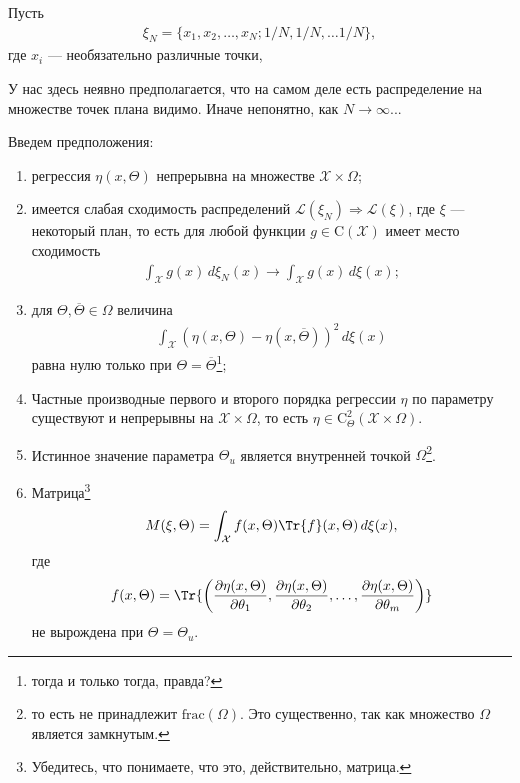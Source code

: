 Пусть 
\begin{gather*}
    \xi_N = \{x_1, x_2, \ldots, x_N; 1/N, 1/N, \ldots 1/N\},
\end{gather*}
где $x_i$ --- необязательно различные точки,

{\color{blue} У нас здесь неявно предполагается, что на самом деле есть распределение на множестве точек плана видимо. Иначе непонятно, как $N \to \infty$... }

Введем предположения:
\begin{enumerate}
    \item
    регрессия $\eta(x, \Theta)$ непрерывна на множестве $\mathcal X \times \Omega$;

    \item 
    имеется слабая сходимость распределений $\mathcal L(\xi_N) \Rightarrow \mathcal L(\xi)$, где $\xi$ --- некоторый план, то есть
    для любой функции $g \in \mathrm C(\mathcal X)$ имеет место сходимость
    \begin{gather*}
        \int_\mathcal X g(x)\, d \xi_N(x) \rightarrow  \int_\mathcal X g(x)\, d \xi(x);
    \end{gather*}

    \item 
    для $\Theta, \overline \Theta \in \Omega$ величина
    \begin{gather*}
        \int_\mathcal X \left(\eta(x, \Theta) - \eta(x, \overline \Theta)\right)^2\, d\xi(x)
    \end{gather*}
    равна нулю только при $\Theta = \overline \Theta$\footnote{тогда и только тогда, правда?};

    \item
    Частные производные первого и второго порядка регрессии $\eta$ по параметру существуют и непрерывны на $\mathcal X \times \Omega$,
    то есть $\eta \in \mathrm C_\Theta^2(\mathcal X \times \Omega)$.

    \item
    Истинное значение параметра $\Theta_u$ является внутренней точкой $\Omega$\footnote{то есть не принадлежит $\mathrm {frac}(\Omega)$.
    Это существенно, так как множество $\Omega$ является замкнутым.}.

    \item
    Матрица\footnote{Убедитесь, что понимаете, что это, действительно, матрица.}
    \begin{gather}
        M(\xi, \Theta) = \int_\mathcal X f(x, \Theta) \Tr{f}(x, \Theta)\, d\xi(x),
    \end{gather}
    где
    \begin{gather*}
        f(x, \Theta) = \Tr{\left(\frac{\partial \eta(x, \Theta)}{\partial \theta_1}, \frac{\partial \eta(x, \Theta)}{\partial \theta_2}, \ldots,
        \frac{\partial \eta(x, \Theta)}{\partial \theta_m}\right)}
    \end{gather*}
    не вырождена при $\Theta = \Theta_u$.
\end{enumerate}

